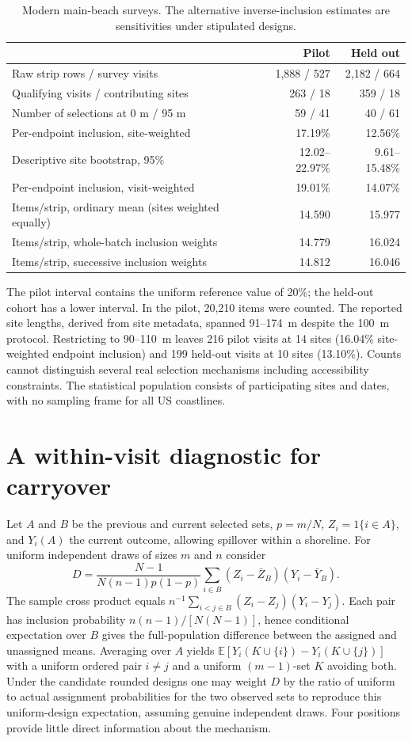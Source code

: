 \documentclass[10pt]{article}
\newcommand{\E}{\mathbb E}
\begin{document}
\begin{table}[ht]\centering\small
\begin{tabular}{lrr}\toprule
 & Pilot & Held out\\\midrule
Raw strip rows / survey visits & 1,888 / 527 & 2,182 / 664\\
Qualifying visits / contributing sites & 263 / 18 & 359 / 18\\
Number of selections at 0 m / 95 m & 59 / 41 & 40 / 61\\
Per-endpoint inclusion, site-weighted & 17.19\% & 12.56\%\\
Descriptive site bootstrap, 95\% & 12.02--22.97\% & 9.61--15.48\%\\
Per-endpoint inclusion, visit-weighted & 19.01\% & 14.07\%\\
Items/strip, ordinary mean (sites weighted equally) & 14.590 & 15.977\\
Items/strip, whole-batch inclusion weights & 14.779 & 16.024\\
Items/strip, successive inclusion weights & 14.812 & 16.046\\\bottomrule
\end{tabular}
\caption{Modern main-beach surveys. The alternative inverse-inclusion estimates are sensitivities under stipulated designs.}\label{tab:data}
\end{table}

The pilot interval contains the uniform reference value of 20\%; the held-out cohort has a lower interval. In the pilot, 20,210 items were counted. The reported site lengths, derived from site metadata, spanned 91--174~m despite the 100~m protocol. Restricting to 90--110~m leaves 216 pilot visits at 14 sites (16.04\% site-weighted endpoint inclusion) and 199 held-out visits at 10 sites (13.10\%). Counts cannot distinguish several real selection mechanisms including accessibility constraints. The statistical population consists of participating sites and dates, with no sampling frame for all US coastlines.

\section{A within-visit diagnostic for carryover}
Let $A$ and $B$ be the previous and current selected sets, $p=m/N$, $Z_i=1\{i\in A\}$, and $Y_i(A)$ the current outcome, allowing spillover within a shoreline. For uniform independent draws of sizes $m$ and $n$ consider
\[
 D=\frac{N-1}{N(n-1)p(1-p)}
   \sum_{i\in B}(Z_i-\bar Z_B)(Y_i-\bar Y_B).
\]
The sample cross product equals $n^{-1}\sum_{i<j\in B}(Z_i-Z_j)(Y_i-Y_j)$. Each pair has inclusion probability $n(n-1)/[N(N-1)]$, hence conditional expectation over $B$ gives the full-population difference between the assigned and unassigned means. Averaging over $A$ yields $\E[Y_i(K\cup\{i\})-Y_i(K\cup\{j\})]$ with a uniform ordered pair $i\ne j$ and a uniform $(m-1)$-set $K$ avoiding both. Under the candidate rounded designs one may weight $D$ by the ratio of uniform to actual assignment probabilities for the two observed sets to reproduce this uniform-design expectation, assuming genuine independent draws. Four positions provide little direct information about the mechanism.
\end{document}
